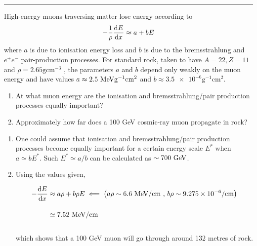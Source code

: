 \noindent\rule{7in}{1.5pt}


\begin{problem}{1.7}
High-energy muons traversing matter lose energy according to
\begin{align*}
    -\frac{1}{\rho} \frac{\mathop{}\!\mathrm{d} E}{\mathop{}\!\mathrm{d} x} \approx a + bE 
\end{align*}
where $a$ is due to ionisation energy loss and $b$ is due to the bremsstrahlung and $e^+e^-$ pair-production processes. 
For standard rock, taken to have $A = 22, Z = 11$ and $\rho = 2.65 \unit{\gram\centi\metre^{-3}}$ , the parameters $a$ and $b$ depend only weakly on 
the muon energy and have values $a \approx 2.5 \MeV\unit{\gram^{-1}\centi\metre^2}$ and $b \approx \num{3.5e-6} \unit{\gram^{-1}\centi\metre^2}$.
\begin{enumerate}[label=(\alph*)]
    \item At what muon energy are the ionisation and bremsstrahlung/pair production processes equally important?
    \item Approximately how far does a 100 GeV cosmic-ray muon propagate in rock?
\end{enumerate}
\end{problem}
\begin{solution}
\begin{enumerate}[label=(\alph*)]
    \item One could assume that ionisation and bremsstrahlung/pair production processes become equally important for a certain energy scale $E^\ast$ when $a \simeq bE^\ast$.
    Such $E^\ast \simeq a/b$ can be calculated as $\sim 700 \text{ GeV}$.
    \item Using the values given, 

    \begin{align*}
        - \frac{\mathop{}\!\mathrm{d} E}{\mathop{}\!\mathrm{d} x} &\approx a \rho + b \rho  E \impliedby \left( a\rho \sim \num{6.6}\text{ MeV}/\text{cm} \text{ , } b \rho \sim \num{9.275e-6}/\text{cm} \right) \\[0.15in]
                                &\simeq 7.52 \text{ MeV}/\text{cm} 
    \end{align*}\\
    which shows that a 100 GeV muon will go through around 132 metres of rock.
\end{enumerate}
\end{solution}

